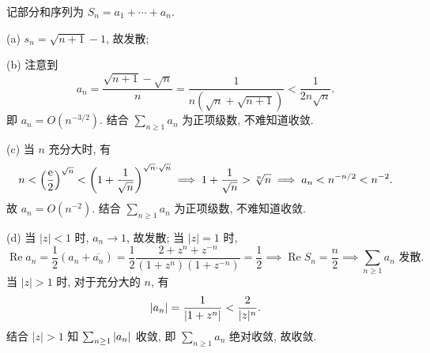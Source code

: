 \documentclass{article}
\begin{document}
\begin{solution}
    记部分和序列为 \( S_n=a_1+\cdots+a_n \). \par
    (a) \( s_n=\sqrt{n+1}-1 \), 故发散;\par
    (b) 注意到
    \[ a_n=\frac{\sqrt{n+1}-\sqrt{n}}{n}=\frac{1}{n \left(\sqrt{n}+\sqrt{n+1}\right)}<\frac{1}{2n \sqrt{n}}. \] 
    即 \( a_n=O(n^{-3/2}) \). 结合 \( \sum_{n\ge 1}a_n \) 为正项级数, 不难知道收敛.\par
    (c) 当 \( n \) 充分大时, 有
    \[ n<\left(\frac{\mathrm{e}}{2}\right)^{\sqrt{n}}<\left(1+\frac{1}{\sqrt{n}}\right)^{\sqrt{n}\cdot\sqrt{n}}\implies1+\frac{1}{\sqrt{n}}>\sqrt[n]{n}\implies a_n<n^{-n/2}<n^{-2}. \] 
    故 \( a_n=O(n^{-2}) \). 结合 \( \sum_{n\ge 1}a_n \) 为正项级数, 不难知道收敛.\par
    (d) 当 \( |z|<1 \) 时, \( a_n\to 1 \), 故发散; 当 \( |z|=1 \) 时, 
    \[ \operatorname{Re} a_n=\frac{1}{2}\left(a_n+\overline{a_n}\right)=\frac{1}{2}\frac{2+z^n+z^{-n}}{(1+z^{n})(1+z^{-n})}=\frac{1}{2}\implies \operatorname{Re} S_n=\frac{n}{2}\implies \sum_{n\ge 1}a_n\text{ 发散.} \] 
    当 \( |z|>1 \) 时, 对于充分大的 \( n \), 有
    \[ \left|a_n\right|=\frac{1}{\left|1+z^n\right|}<\frac{2}{|z|^n}. \] 
    结合 \( |z|>1 \) 知 \( \sum_{n\ge 1}\left|a_n\right| \) 收敛, 即 \( \sum_{n\ge 1}a_n \) 绝对收敛, 故收敛.
\end{solution}
\end{document}
